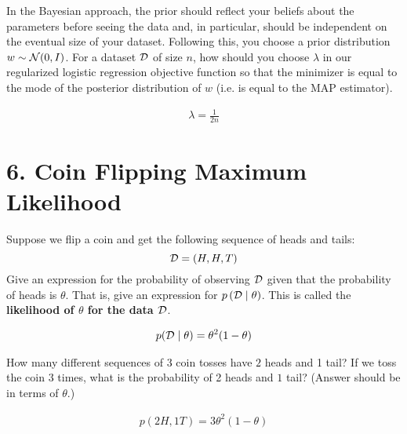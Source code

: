 \documentclass[12pt,letterpaper]{article}
\begin{document}
\begin{problem}{4.3}
    In the Bayesian approach, the prior should reflect your beliefs about
    the parameters before seeing the data and, in particular, should be
    independent on the eventual size of your dataset. Following this,
    you choose a prior distribution $w\sim\mathcal{N}(0,I)$. For a dataset $\mathcal{D}$
    of size $n$, how should you choose $\lambda$ in our regularized
    logistic regression objective function so that the minimizer is equal
    to the mode of the posterior distribution of $w$ (i.e. is equal to
    the MAP estimator).
\end{problem}
\begin{solution}{}
    \begin{align*}
        \lambda = \frac{1}{2n}
    \end{align*}
\end{solution}
\newpage


\section*{6. Coin Flipping Maximum Likelihood}
\begin{problem}{6.1}
    Suppose we flip a coin and get the following sequence
    of heads and tails:
    \[
    \mathcal{D}=(H,H,T)
    \]
    Give an expression for the probability of observing $\mathcal{D}$ given that
    the probability of heads is $\theta$. That is, give an expression
    for $p\left(\mathcal{D}\mid\theta\right)$. This is called the \textbf{likelihood
    of $\theta$ for the data $\mathcal{D}$}.
\end{problem}
\begin{solution}{}
    \begin{align*}
        p(\mathcal{D}\mid\theta) = \theta^2(1-\theta)
    \end{align*}
\end{solution}
\newpage

\begin{problem}{6.2}
    How many different sequences of 3 coin tosses have
    $2$ heads and 1 tail? If we toss the coin $3$ times, what is the
    probability of 2 heads and $1$ tail? (Answer should be in terms of
    $\theta$.)
\end{problem}
\begin{solution}{}
    \begin{align*}
        p(2H,1T) = 3\theta^2(1-\theta)
    \end{align*}
\end{solution}
\newpage
\end{document}
